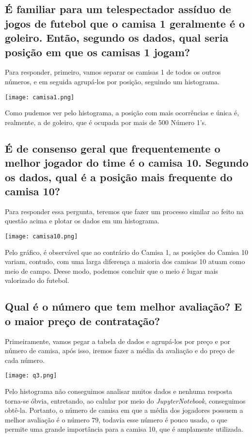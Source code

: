 \documentclass[12pt]{article}
\begin{document}
\subsection{ É familiar para um telespectador assíduo de jogos de futebol que o camisa 1 geralmente é o goleiro. Então, segundo os dados, qual seria posição em que os camisas 1 jogam?}
Para responder, primeiro, vamos separar os camisas 1 de todos os outros números, e em seguida agrupá-los por posição, seguindo um histograma.

\texttt{[image: camisa1.png]}

Como pudemos ver pelo histograma, a posição com mais ocorrências e única é, realmente, a de goleiro, que é ocupada por mais de 500 Número 1's.

\subsection{ É de consenso geral que frequentemente o melhor jogador do time é o camisa 10. Segundo os dados, qual é a posição mais  frequente do camisa 10?}
Para responder essa pergunta, teremos que fazer um processo similar ao feito na questão acima e plotar os dados em um histograma.

\texttt{[image: camisa10.png]}

Pelo gráfico, é observável que ao contrário do Camisa 1, as posições do Camisa 10 variam, contudo, com uma larga diferença a maioria dos camisas 10 atuam como meio de campo. Deese modo, podemos concluir que o meio é lugar mais valorizado do futebol.



\subsection{Qual é o número que tem melhor avaliação? E o maior preço de contratação?}

Primeiramente, vamos pegar a tabela de dados e agrupá-los por preço e por número de camisa, após isso, iremos fazer a média da avaliação e do preço de cada número.


\texttt{[image: q3.png]}

Pelo histograma não conseguimos analisar muitos dados e nenhuma resposta torna-se óbvia, entretando, ao calular por meio do \emph{JupyterNotebook}, conseguimos obtê-la. Portanto, o número de camisa em que a média dos jogadores possuem a melhor avaliação é o número $79$, todavia esse número é pouco usado, o que permite uma grande importância para a camisa 10, que é amplamente utilizada.
\end{document}
